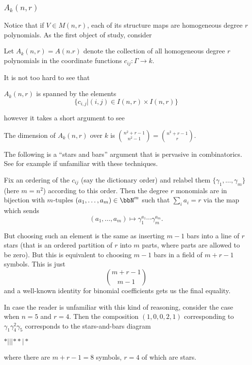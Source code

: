 \documentclass[12pt]{article}
\begin{document}
\subsubsection{\texorpdfstring{$A_k(n,r)$}{Ak(n,r)}}
Notice that if $V\in M(n,r)$, each of its structure maps are homogeneous degree $r$ polynomials. As the first object of study, consider 
\begin{defn}
	Let $A_k(n,r)=A(n.r)$ denote the collection of all homogeneous degree $r$ polynomials in the 
	coordinate functions $c_{ij}:\Gamma\to k$.
\end{defn}
It is not too hard to see that 
\begin{prop}
	$A_k(n,r)$ is spanned by the elements 
	\[\{c_{i,j}|(i,j)\in I(n,r)\times I(n,r)\}\]
\end{prop}
however it takes a short argument to see 
\begin{lem}
	The dimension of $A_k(n,r)$ over $k$ is $\binom{n^2+r-1}{n^2-1}=\binom{n^2+r-1}{r}$.
\end{lem}
\begin{prf}
	The following is a ``stars and bars'' argument that is pervasive in combinatorics. See for example \cite{stanley} if unfamiliar with these techniques.
	
	Fix an ordering of the $c_{ij}$ (say the dictionary order)
	and relabel them $\{\gamma_1,\dots,\gamma_{m}\}$ (here $m=n^2$) according to this order. Then the degree $r$ monomials are in bijection with $m$-tuples $(a_1,\dots,a_{m})\in\bbN^m$ such that $\sum_i a_i=r$ via the map which sends 
	\[(a_1,\dots,a_{m})\mapsto \gamma_1^{a_1}\cdots\gamma_{m}^{a_{m}}.\]

	But choosing such an element is the same as inserting $m-1$ bars into a line of $r$ stars (that is an ordered partition of $r$ into $m$ parts, 
	where parts are allowed to be zero). But this is equivalent to choosing $m-1$ bars in a field of $m+r-1$ symbols. This is just 
	\[\binom{m+r-1}{m-1}\]
	and a well-known identity for binomial coefficients gets us the final equality.
\end{prf}
\begin{ex}
	In case the reader is unfamiliar with this kind of reasoning, consider the case when $n=5$ and $r=4$. Then the composition $(1,0,0,2,1)$ corresponding to 
	$\gamma_1\gamma_4^2\gamma_5$ corresponds to the stars-and-bars diagram 
	\begin{center}
		$\ast|||\ast\ast|\ast$
	\end{center}
	where there are $m+r-1=8$ symbols, $r=4$ of which are stars.
\end{ex}
\end{document}
